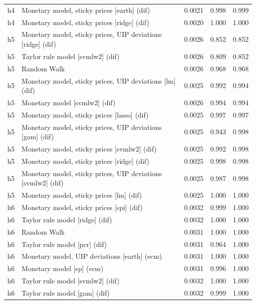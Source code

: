 \begin{ThreePartTable}
\begin{longtable}[t]{cp{5.5cm}ccc}
h4 & \raggedright Monetary model, sticky prices [earth] (dif) & 0.0021 & 0.998 & 0.999\\
h4 & \raggedright Monetary model, sticky prices [ridge] (dif) & 0.0020 & 1.000 & 1.000\\
\addlinespace
h5 & \raggedright Monetary model, sticky prices, UIP deviations [ridge] (dif) & 0.0026 & 0.852 & 0.852\\
h5 & \raggedright Taylor rule model [svmlw2] (dif) & 0.0026 & 0.809 & 0.852\\
h5 & \raggedright Random Walk & 0.0026 & 0.968 & 0.968\\
h5 & \raggedright Monetary model, sticky prices, UIP deviations [lm] (dif) & 0.0025 & 0.992 & 0.994\\
h5 & \raggedright Monetary model [svmlw2] (dif) & 0.0026 & 0.994 & 0.994\\
h5 & \raggedright Monetary model, sticky prices [lasso] (dif) & 0.0025 & 0.997 & 0.997\\
h5 & \raggedright Monetary model, sticky prices, UIP deviations [gam] (dif) & 0.0025 & 0.943 & 0.998\\
h5 & \raggedright Monetary model, sticky prices [svmlw2] (dif) & 0.0025 & 0.992 & 0.998\\
h5 & \raggedright Monetary model, sticky prices [ridge] (dif) & 0.0025 & 0.998 & 0.998\\
h5 & \raggedright Monetary model, sticky prices, UIP deviations [svmlw2] (dif) & 0.0025 & 0.987 & 0.998\\
h5 & \raggedright Monetary model, sticky prices [lm] (dif) & 0.0025 & 1.000 & 1.000\\
\addlinespace
h6 & \raggedright Monetary model, sticky prices [spi] (dif) & 0.0032 & 0.999 & 1.000\\
h6 & \raggedright Taylor rule model [ridge] (dif) & 0.0032 & 1.000 & 1.000\\
h6 & \raggedright Random Walk & 0.0031 & 1.000 & 1.000\\
h6 & \raggedright Taylor rule model [pcr] (dif) & 0.0031 & 0.964 & 1.000\\
h6 & \raggedright Monetary model, UIP deviations [earth] (ecm) & 0.0031 & 1.000 & 1.000\\
h6 & \raggedright Monetary model [sp] (ecm) & 0.0031 & 0.996 & 1.000\\
h6 & \raggedright Taylor rule model [svmlw2] (dif) & 0.0032 & 1.000 & 1.000\\
h6 & \raggedright Taylor rule model [gam] (dif) & 0.0032 & 0.999 & 1.000\\

\end{longtable}
\end{ThreePartTable}
